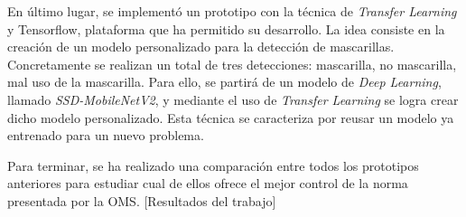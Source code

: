 En último lugar, se implementó un prototipo con la técnica de \textit{Transfer Learning} y Tensorflow, plataforma que ha permitido su desarrollo. La idea consiste en la creación de un modelo personalizado para la detección de mascarillas. Concretamente se realizan un total de tres detecciones: mascarilla, no mascarilla, mal uso de la mascarilla. Para ello, se partirá de un modelo de \textit{Deep Learning}, llamado \textit{SSD-MobileNetV2}, y mediante el uso de \textit{Transfer Learning} se logra crear dicho modelo personalizado. Esta técnica se caracteriza por reusar un modelo ya entrenado para un nuevo problema.

Para terminar, se ha realizado una comparación entre todos los prototipos anteriores para estudiar cual de ellos ofrece el mejor control de la norma presentada por la OMS. [Resultados del trabajo]
